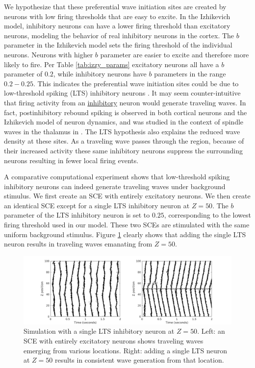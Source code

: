 \documentclass[12pt]{article}
\begin{document}
We hypothesize that these preferential wave initiation sites are created by neurons with low firing thresholds that are easy to excite.
In the Izhikevich model, inhibitory neurons can have a lower firing threshold than excitatory neurons, modeling the behavior of real inhibitory neurons in the cortex\parencite{gibson2009}\parencite{hayut2011}.
The $b$ parameter in the Izhikevich model sets the firing threshold of the individual neurons.
Neurons with higher $b$ parameter are easier to excite and therefore more likely to fire.
Per Table \ref{tab:izzy_params} excitatory neurons all have a $b$ parameter of $0.2$, while inhibitory neurons have $b$ parameters in the range $0.2-0.25$.
This indicates the preferential wave initiation sites could be due to low-threshold spiking (LTS) inhibitory neurons \parencite{izhikevich2003}.
It may seem counter-intuitive that firing activity from an \underline{inhibitory} neuron would generate traveling waves.
In fact, postinhibitory rebound spiking is observed in both cortical neurons \parencite{ascoli2010} and the Izhikevich model of neuron dynamics, \color{red} and was studied in the context of spindle waves in the thalamus in \parencite{Golomb1996}\color{black}.
The LTS hypothesis also explains the reduced wave density at these sites.
As a traveling wave passes through the region, because of their increased activity these same inhibitory neurons suppress the surrounding neurons resulting in fewer local firing events.

A comparative computational experiment shows that low-threshold spiking inhibitory neurons can indeed generate traveling waves under background stimulus.
We first create an SCE with entirely excitatory neurons.
We then create an identical SCE except for a single LTS inhibitory neuron at $Z=50$.
The $b$ parameter of the LTS inhibitory neuron is set to $0.25$, corresponding to the lowest firing threshold used in our model.
These two SCEs are stimulated with the same uniform background stimulus. 
Figure \ref{fig:lts_inhibit} clearly shows that adding the single LTS neuron results in traveling waves emanating from $Z=50$. 
\begin{figure}[!htb]
 \caption{Simulation with a single LTS inhibitory neuron at $Z=50$. Left: an SCE with entirely excitatory neurons shows traveling waves emerging from various locations. Right: adding a single LTS neuron at $Z=50$ results in consistent wave generation from that location. }
 \label{fig:lts_inhibit}
 \centering
   \includegraphics[width=\textwidth]{fig/SingleLTSInhibit}
\end{figure}
\end{document}

